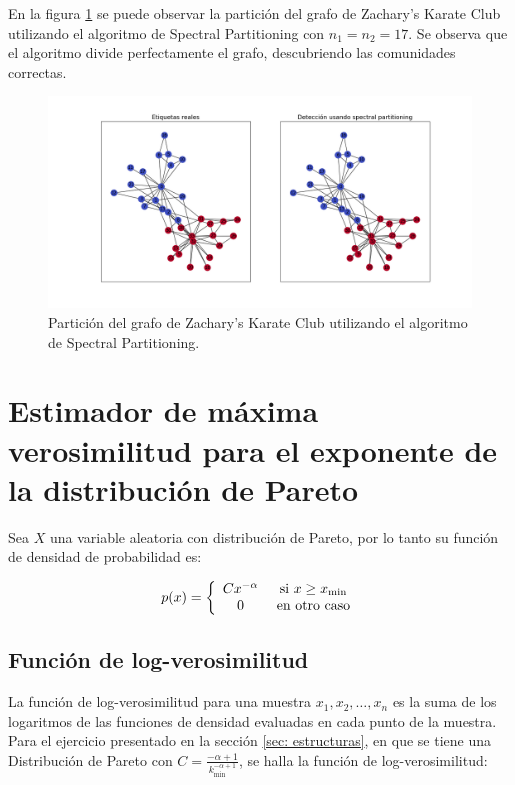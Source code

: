 \documentclass{article}
\begin{document}
En la figura \ref{fig: spectral_partitioning} se puede observar la partición del grafo de Zachary's Karate Club utilizando el algoritmo de Spectral Partitioning con $n_1 = n_2 = 17$. Se observa que el algoritmo divide perfectamente el grafo, descubriendo las comunidades correctas.

\begin{figure}[htb]
    \centering
    \includegraphics[width=\textwidth]{imagenes/spectral_partitioning.png}
    \caption{Partición del grafo de Zachary's Karate Club utilizando el algoritmo de Spectral Partitioning.}
    \label{fig: spectral_partitioning}
\end{figure}


\section{Estimador de máxima verosimilitud para el exponente de la distribución de Pareto} \label{sec: pareto}

Sea $X$ una variable aleatoria con distribución de Pareto, por lo tanto su función de densidad de probabilidad es:

$$p(x) = \left\lbrace \begin{array}{c c} C x^{-\alpha} & \text{ si } x\geq x_\text{min} \\ 0 & \text{ en otro caso} \end{array}\right.$$

\subsection{Función de log-verosimilitud}

La función de log-verosimilitud para una muestra $x_1, x_2, \ldots, x_n$ es la suma de los logaritmos de las funciones de densidad evaluadas en cada punto de la muestra. Para el ejercicio presentado en la sección \ref{sec: estructuras}, en que se tiene una Distribución de Pareto con $C = \frac{-\alpha+1}{k_{\text{min}}^{-\alpha+1}}$, se halla la función de log-verosimilitud:
\end{document}
